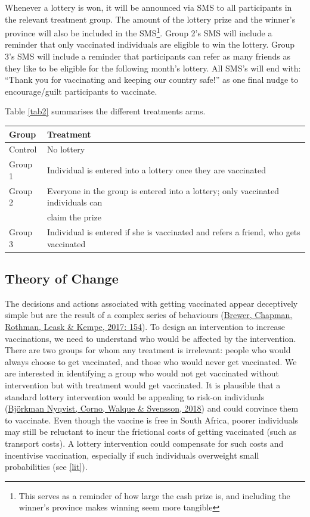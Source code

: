\documentclass[11pt,preprint, authoryear]{elsarticle}
\let\origtable\table
\let\endorigtable\endtable
\renewenvironment{table}[1][2] {
    \expandafter\origtable\expandafter[H]
} {
    \endorigtable
}
\numberwithin{equation}{section}
\numberwithin{figure}{section}
\numberwithin{table}{section}
\let\rmarkdownfootnote\footnote%
\def\footnote{\protect\rmarkdownfootnote}
\begin{document}
Whenever a lottery is won, it will be announced via SMS to all
participants in the relevant treatment group. The amount of the lottery
prize and the winner's province will also be included in the
SMS\footnote{This serves as a reminder of how large the cash prize is,
  and including the winner's province makes winning seem more tangible}.
Group 2's SMS will include a reminder that only vaccinated individuals
are eligible to win the lottery. Group 3's SMS will include a reminder
that participants can refer as many friends as they like to be eligible
for the following month's lottery. All SMS's will end with: ``Thank you
for vaccinating and keeping our country safe!'' as one final nudge to
encourage/guilt participants to vaccinate.

Table \ref{tab2} summarises the different treatments arms.

\begin{table}[H]
\centering
\begin{tabular}{ll}
  \toprule
Group & Treatment \\ 
  \midrule
Control & No lottery \\ 
  Group 1 & Individual is entered into a lottery once they are vaccinated \\ 
  Group 2 & Everyone in the group is entered into a lottery; only vaccinated individuals can \\ 
   & claim the prize \\ 
  Group 3 & Individual is entered if she is vaccinated and refers a friend, who gets vaccinated \\ 
   \bottomrule
\end{tabular}
\caption{Treatment Summary \label{tab2}} 
\end{table}

\hypertarget{theory-of-change}{%
\subsection{Theory of Change}\label{theory-of-change}}

The decisions and actions associated with getting vaccinated appear
deceptively simple but are the result of a complex series of behaviours
(\protect\hyperlink{ref-decide}{Brewer, Chapman, Rothman, Leask \&
Kempe, 2017: 154}). To design an intervention to increase vaccinations,
we need to understand who would be affected by the intervention. There
are two groups for whom any treatment is irrelevant: people who would
always choose to get vaccinated, and those who would never get
vaccinated. We are interested in identifying a group who would not get
vaccinated without intervention but with treatment would get vaccinated.
It is plausible that a standard lottery intervention would be appealing
to risk-on individuals (\protect\hyperlink{ref-hiv}{Björkman Nyqvist,
Corno, Walque \& Svensson, 2018}) and could convince them to vaccinate.
Even though the vaccine is free in South Africa, poorer individuals may
still be reluctant to incur the frictional costs of getting vaccinated
(such as transport costs). A lottery intervention could compensate for
such costs and incentivise vaccination, especially if such individuals
overweight small probabilities (see \ref{lit}).
\end{document}

